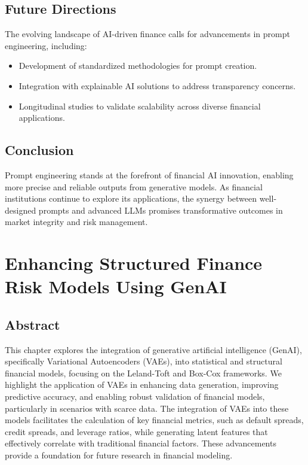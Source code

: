 \documentclass[a4paper,headinclude=on,footinclude=on,12pt,oneside]{scrbook}
\begin{document}
\section{Future Directions}
The evolving landscape of AI-driven finance calls for advancements in prompt engineering, including:
\begin{itemize}
	\item Development of standardized methodologies for prompt creation.
	\item Integration with explainable AI solutions to address transparency concerns.
	\item Longitudinal studies to validate scalability across diverse financial applications.
\end{itemize}

\section{Conclusion}
Prompt engineering stands at the forefront of financial AI innovation, enabling more precise and reliable outputs from generative models. As financial institutions continue to explore its applications, the synergy between well-designed prompts and advanced LLMs promises transformative outcomes in market integrity and risk management.



\chapter{Enhancing Structured Finance Risk Models Using GenAI}

\section*{Abstract}
This chapter explores the integration of generative artificial intelligence (GenAI), specifically Variational Autoencoders (VAEs), into statistical and structural financial models, focusing on the Leland-Toft and Box-Cox frameworks. We highlight the application of VAEs in enhancing data generation, improving predictive accuracy, and enabling robust validation of financial models, particularly in scenarios with scarce data. The integration of VAEs into these models facilitates the calculation of key financial metrics, such as default spreads, credit spreads, and leverage ratios, while generating latent features that effectively correlate with traditional financial factors. These advancements provide a foundation for future research in financial modeling.
\end{document}

